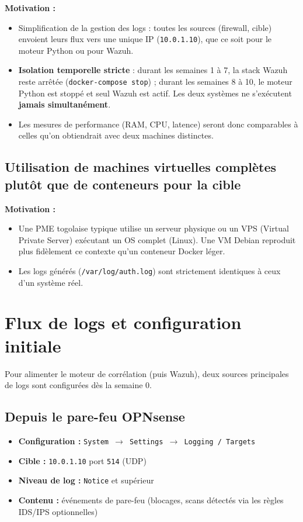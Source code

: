 \documentclass[12pt,a4paper]{article}
\begin{document}
\textbf{Motivation :}
\begin{itemize}
    \item Simplification de la gestion des logs : toutes les sources (firewall, cible) envoient leurs flux vers une unique IP (\texttt{10.0.1.10}), que ce soit pour le moteur Python ou pour Wazuh.
    \item \textbf{Isolation temporelle stricte} : durant les semaines 1 à 7, la stack Wazuh reste arrêtée (\texttt{docker-compose stop}) ; durant les semaines 8 à 10, le moteur Python est stoppé et seul Wazuh est actif. Les deux systèmes ne s'exécutent \textbf{jamais simultanément}.
    \item Les mesures de performance (RAM, CPU, latence) seront donc comparables à celles qu'on obtiendrait avec deux machines distinctes.
\end{itemize}

\subsection{Utilisation de machines virtuelles complètes plutôt que de conteneurs pour la cible}

\textbf{Motivation :}
\begin{itemize}
    \item Une PME togolaise typique utilise un serveur physique ou un VPS (Virtual Private Server) exécutant un OS complet (Linux). Une VM Debian reproduit plus fidèlement ce contexte qu'un conteneur Docker léger.
    \item Les logs générés (\texttt{/var/log/auth.log}) sont strictement identiques à ceux d'un système réel.
\end{itemize}

\section{Flux de logs et configuration initiale}
\label{sec:logs}

Pour alimenter le moteur de corrélation (puis Wazuh), deux sources principales de logs sont configurées dès la semaine 0.

\subsection{Depuis le pare-feu OPNsense}

\begin{itemize}
    \item \textbf{Configuration :} \texttt{System $\rightarrow$ Settings $\rightarrow$ Logging / Targets}
    \item \textbf{Cible :} \texttt{10.0.1.10} port \texttt{514} (UDP)
    \item \textbf{Niveau de log :} \texttt{Notice} et supérieur
    \item \textbf{Contenu :} événements de pare-feu (blocages, scans détectés via les règles IDS/IPS optionnelles)
\end{itemize}
\end{document}
